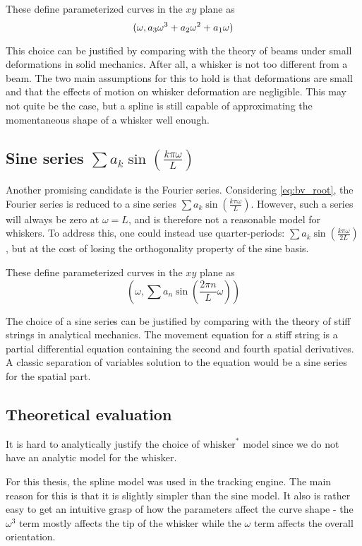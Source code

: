 These define parameterized curves in the $xy$ plane as
\begin{equation}
  (\omega,a_3\omega^3+a_2\omega^2+a_1\omega)
\end{equation}

This choice can be justified by comparing with the theory of beams
under small deformations in solid mechanics. After all, a whisker is
not too different from a beam. The two main assumptions for this to
hold is that deformations are small and that the effects of motion on
whisker deformation are negligible. \cite{Hallfasthet} This may not
quite be the case, but a spline is still capable of approximating the
momentaneous shape of a whisker well enough.

\subsection{Sine series $\sum a_k\sin \left(\frac{k\pi\omega}{L}\right)$}
Another promising candidate is the Fourier series. Considering
\eqref{eq:bv_root}, the Fourier series is reduced to a sine series
$\sum a_k\sin \left(\frac{k\pi\omega}{L}\right)$. However, such a
series will always be zero at $\omega = L$, and is therefore not a
reasonable model for whiskers. To address this, one could instead use
quarter-periods: $\sum a_k \sin\left( \frac{k\pi\omega}{2L}\right)$,
but at the cost of losing the orthogonality property of the sine
basis.

These define parameterized curves in the $xy$ plane as
\begin{equation}
    (\omega,\sum{a_n\sin (\frac{2\pi n}{L}\omega)})
\end{equation}


The choice of a sine series can be justified by comparing with the
theory of stiff strings in analytical mechanics. The movement equation
for a stiff string is a partial differential equation containing the
second and fourth spatial derivatives. A classic separation of
variables solution to the equation would be a sine series for the
spatial part.

\subsection{Theoretical evaluation}

It is hard to analytically justify the choice of $\text{whisker}^*$
model since we do not have an analytic model for the $\text{whisker}$.

For this thesis, the spline model was used in the tracking engine. The
main reason for this is that it is slightly simpler than the sine
model. It also is rather easy to get an intuitive grasp of how the
parameters affect the curve shape - the $\omega^3$ term mostly affects
the tip of the whisker while the $\omega$ term affects the overall
orientation.
